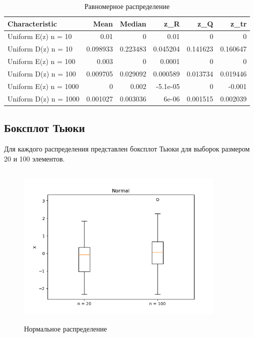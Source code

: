 \documentclass[../body.tex]{subfiles}
\begin{document}
\begin{table}[H]
	\centering
	\begin{tabular}[t]{lrrrrr}
		\hline
		Characteristic    &      Mean &    Median &       z\_R &       z\_Q &      z\_tr \\
		\hline
		Uniform E(z) n = 10   &  0.01 &  0 &  0.01 &  0 &  0 \\
		Uniform D(z) n = 10   &  0.098933 &  0.223483 &  0.045204 &  0.141623 &  0.160647 \\
		Uniform E(z) n = 100  &  0.003 &  0 &  0.0001 &  0 &  0 \\
		Uniform D(z) n = 100  &  0.009705 &  0.029092 &  0.000589 &  0.013734 &  0.019446 \\
		Uniform E(z) n = 1000 &  0 &  0.002 & -5.1e-05  &  0 & -0.001   \\
		Uniform D(z) n = 1000 &  0.001027 &  0.003036 &  6e-06    &  0.001515 &  0.002039 \\
		\hline
	\end{tabular}
	\caption{Равномерное распределение}
	\label{tab:uniform}
\end{table}

\subsection{Боксплот Тьюки}
Для каждого распределения представлен боксплот Тьюки для выборок размером 20 и 100 элементов.
\begin{figure}[H]
	\centering
	\includegraphics[width = 10cm, height = 8cm]{img/Normal_boxplot.png}
	\caption{Нормальное распределение}
	\label{fig:normal_boxplot}
\end{figure}
\end{document}
